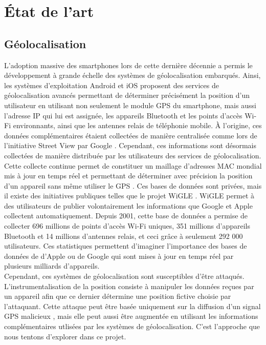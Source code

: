 \documentclass[runningheads]{llncs}
\begin{document}
\section{État de l'art}

\subsection{Géolocalisation}

L'adoption massive des smartphones lors de cette dernière décennie a permis le développement à grande échelle des systèmes de géolocalisation embarqués. Ainsi, les systèmes d'exploitation Android \cite{google_how_2020} et iOS \cite{apple_location_2020} proposent des services de géolocalisation avancés permettant de déterminer précisément la position d'un utilisateur en utilisant non seulement le module GPS du smartphone, mais aussi l'adresse IP qui lui est assignée, les appareils Bluetooth et les points d'accès Wi-Fi environnants, ainsi que les antennes relais de téléphonie mobile. À l'origine, ces données complémentaires étaient collectées de manière centralisée comme lors de l'initiative Street View par Google \cite{peter_fleischer_data_2010}. 
Cependant, ces informations sont désormais collectées de manière distribuée par les utilisateurs des services de géolocalisation. Cette collecte continue permet de constituer un maillage d'adresses MAC mondial mis à jour en temps réel et permettant de déterminer avec précision la position d'un appareil sans même utiliser le GPS \cite{google_overview_2020}.
Ces bases de données sont privées, mais il existe des initiatives publiques telles que le projet WiGLE \cite{bobzilla_wigle_2020}. WiGLE permet à des utilisateurs de publier volontairement les informations que Google et Apple collectent automatiquement. Depuis 2001, cette base de données a permise de collecter 696 millions de points d'accès Wi-Fi uniques, 351 millions d'appareils Bluetooth et 14 millions d'antennes relais, et ceci grâce à seulement 292 000 utilisateurs. Ces statistiques permettent d'imaginer l'importance des bases de données de d'Apple ou de Google qui sont mises à jour en temps réel par plusieurs milliards d'appareils. \cite{google_google_2019}  \\

Cependant, ces systèmes de géolocalisation sont susceptibles d'être attaqués. L'instrumentalisation de la position consiste à manipuler les données reçues par un appareil afin que ce dernier détermine une position fictive choisie par l'attaquant. Cette attaque peut être basée uniquement sur la diffusion d'un signal GPS malicieux \cite{huang_low-cost_2015}\cite{liu_all_2018}, mais elle peut aussi être augmentée en utilisant les informations complémentaires utlisées par les systèmes de géolocalisation. C'est l'approche que nous tentons d'explorer dans ce projet. \\
\end{document}
